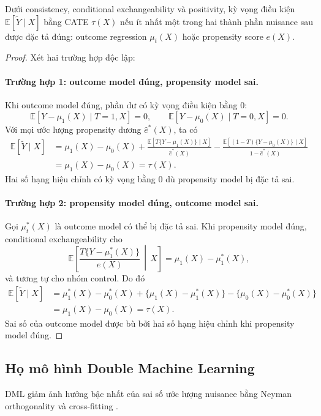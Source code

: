 \documentclass[11pt,a4paper]{article}
\newcommand{\Exp}{\mathbb{E}}
\begin{document}
\begin{theorem}
Dưới consistency, conditional exchangeability và positivity, kỳ vọng điều
kiện $\Exp[\tilde{Y}\mid X]$ bằng CATE $\tau(X)$ nếu ít nhất một trong hai
thành phần nuisance sau được đặc tả đúng: outcome regression $\mu_t(X)$ hoặc
propensity score $e(X)$.
\end{theorem}

\begin{proof}
Xét hai trường hợp độc lập:

\paragraph{Trường hợp 1: outcome model đúng, propensity model sai.}
Khi outcome model đúng, phần dư có kỳ vọng điều kiện bằng 0:
\[
\Exp[Y-\mu_1(X)\mid T=1,X]=0,\qquad
\Exp[Y-\mu_0(X)\mid T=0,X]=0.
\]
Với mọi ước lượng propensity dương $\hat e^*(X)$, ta có
\begin{align*}
\Exp[\tilde{Y}\mid X]
&=\mu_1(X)-\mu_0(X)
+\frac{\Exp[T\{Y-\mu_1(X)\}\mid X]}{\hat e^*(X)}
-\frac{\Exp[(1-T)\{Y-\mu_0(X)\}\mid X]}{1-\hat e^*(X)}\\
&=\mu_1(X)-\mu_0(X)=\tau(X).
\end{align*}
Hai số hạng hiệu chỉnh có kỳ vọng bằng 0 dù propensity model bị đặc tả sai.

\paragraph{Trường hợp 2: propensity model đúng, outcome model sai.}
Gọi $\mu_t^*(X)$ là outcome model có thể bị đặc tả sai. Khi propensity model
đúng, conditional exchangeability cho
\[
\Exp\left[\frac{T\{Y-\mu_1^*(X)\}}{e(X)}\,\middle|\,X\right]
=\mu_1(X)-\mu_1^*(X),
\]
và tương tự cho nhóm control. Do đó
\begin{align*}
\Exp[\tilde{Y}\mid X]
&=\mu_1^*(X)-\mu_0^*(X)
+\{\mu_1(X)-\mu_1^*(X)\}
-\{\mu_0(X)-\mu_0^*(X)\}\\
&=\mu_1(X)-\mu_0(X)=\tau(X).
\end{align*}
Sai số của outcome model được bù bởi hai số hạng hiệu chỉnh khi propensity
model đúng.
\end{proof}

\subsection{Họ mô hình Double Machine Learning}

DML giảm ảnh hưởng bậc nhất của sai số ước lượng nuisance bằng Neyman
orthogonality và cross-fitting \cite{chernozhukov2018}.
\end{document}
